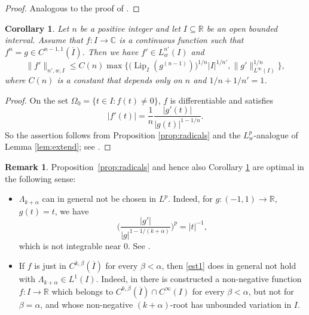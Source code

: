 \documentclass[12pt]{amsart}
\theoremstyle{plain}
\newtheorem{corollary}{Corollary}
\theoremstyle{definition}
\newtheorem{remark}{Remark}
\numberwithin{equation}{section}
\let\on=\operatorname
\begin{document}
\begin{proof}
  Analogous to the proof of \cite[Proposition~3.1]{ParusinskiRainerAC}.
\end{proof}

\begin{corollary} \label{cor:radicals}
  Let $n$ be a positive integer and 
  let $I \subseteq {\mathbb{R}}$ be an open bounded interval. Assume that $f : I \to {\mathbb{C}}$ is a continuous function such that 
  $f^n = g \in C^{n-1,1}({\overline I})$.
  Then we have $f' \in L^{n'}_w(I)$ and 
  \begin{equation} \label{est}
    \|f'\|_{n',w,I} \le 
    C(n) \max\Big\{\big({\on{Lip}}_{I}(g^{(n-1)})\big)^{1/n}|I|^{1/n'}, 
    \|g'\|_{L^\infty(I)}^{1/n}\Big\}, 
  \end{equation}
  where $C(n)$ is a constant that depends only on $n$ and $1/n +1/n'=1$.  
\end{corollary}

\begin{proof}
  On the set ${\Omega}_0 = \{t \in I : f(t) \ne 0\}$, $f$ is differentiable and satisfies
  \[
    |f'(t)|   
    = \frac 1 n \frac{|g'(t)|}{|g(t)|^{1-1/n}}.
  \]  
  So the assertion follows from Proposition \ref{prop:radicals} and the $L^p_w$-analogue of Lemma \ref{lem:extend}; see 
  \cite[Lemma~2.1]{ParusinskiRainerAC}.
\end{proof}

\begin{remark}
  Proposition~\ref{prop:radicals} and hence also Corollary \ref{cor:radicals} are optimal in the following sense:
  \begin{itemize}
    \item ${\Lambda}_{k+{\alpha}}$ can in general not be chosen in $L^p$. Indeed, for $g : (-1,1) \to {\mathbb{R}}$, $g(t)=t$, we have 
    \[
    \Big(\frac{|g'|}{|g|^{1-1/(k+{\alpha})}}\Big)^p  = |t|^{-1},
    \] 
    which is not integrable near $0$. See \cite[Example 4.3]{GhisiGobbino13}.
    \item If $f$ is just in $C^{k,{\beta}}(\overline I)$ for every ${\beta}<{\alpha}$, 
    then \eqref{est1} does in general not hold with ${\Lambda}_{k+{\alpha}} \in L^1(I)$.
    Indeed, in \cite[Example 4.4]{GhisiGobbino13} there is constructed a non-negative function $f : I \to {\mathbb{R}}$ 
    which belongs to $C^{k,{\beta}}(\overline I) \cap C^{\infty}(I)$ for every ${\beta} < {\alpha}$, but not for ${\beta} = {\alpha}$, 
    and whose non-negative $(k+{\alpha})$-root has unbounded variation in $I$.    
  \end{itemize}
\end{remark}
\end{document}
